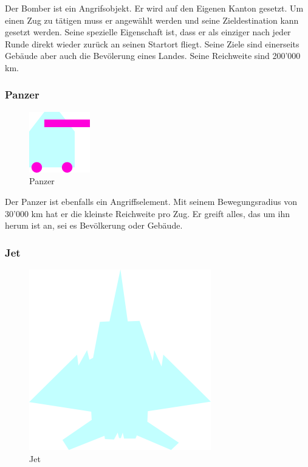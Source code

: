 \documentclass[ngerman, 12pt, pdftex]{scrartcl}[2006/07/30]
\begin{document}
Der Bomber ist ein Angrifsobjekt.
Er wird auf den Eigenen Kanton gesetzt. Um einen Zug zu tätigen muss er angewählt werden und seine Zieldestination kann gesetzt werden. Seine spezielle Eigenschaft ist, dass er als einziger nach jeder Runde direkt wieder zurück an seinen Startort fliegt.
Seine Ziele sind einerseits Gebäude aber auch die Bevölerung eines Landes. Seine Reichweite sind 200'000 km.

\subsubsection{Panzer}

\begin{figure}[h]
\centering
\includegraphics[scale=1.8]{spiel/Panzer.png}
\caption{Panzer}
\end{figure}

Der Panzer ist ebenfalls ein Angriffselement.
Mit seinem Bewegungsradius von 30'000 km hat er die kleinste Reichweite pro Zug. Er greift alles, das um ihn herum ist an, sei es Bevölkerung oder Gebäude. 

\newpage

\subsubsection{Jet}

\begin{figure}[h]
\centering
\includegraphics[scale=1.8]{spiel/Flugzeug.png}
\caption{Jet}
\end{figure}
\end{document}
